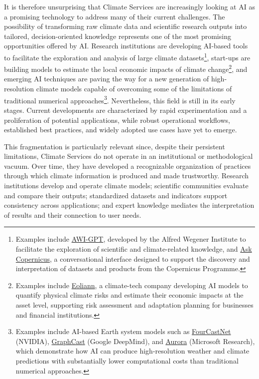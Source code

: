 It is therefore unsurprising that Climate Services are increasingly looking at AI as a promising technology to address many of their current challenges. The possibility of transforming raw climate data and scientific research outputs into tailored, decision-oriented knowledge represents one of the most promising opportunities offered by AI. Research institutions are developing AI-based tools to facilitate the exploration and analysis of large climate datasets\footnote{Examples include \href{https://helmholtz.software/software/awi-gpt}{AWI-GPT}, developed by the Alfred Wegener Institute to facilitate the exploration of scientific and climate-related knowledge, and \href{https://ask.copernicus.eu/}{Ask Copernicus}, a conversational interface designed to support the discovery and interpretation of datasets and products from the Copernicus Programme.}, start-ups are building models to estimate the local economic impacts of climate change\footnote{Examples include \href{https://www.eoliann.com/}{Eoliann}, a climate-tech company developing AI models to quantify physical climate risks and estimate their economic impacts at the asset level, supporting risk assessment and adaptation planning for businesses and financial institutions.}, and emerging AI techniques are paving the way for a new generation of high-resolution climate models capable of overcoming some of the limitations of traditional numerical approaches\footnote{Examples include AI-based Earth system models such as \href{https://github.com/NVlabs/FourCastNet}{FourCastNet} (NVIDIA), \href{https://www.nature.com/articles/s41586-023-06185-3}{GraphCast} (Google DeepMind), and \href{https://www.nature.com/articles/s41586-024-07744-y}{Aurora} (Microsoft Research), which demonstrate how AI can produce high-resolution weather and climate predictions with substantially lower computational costs than traditional numerical approaches.}. Nevertheless, this field is still in its early stages. Current developments are characterized by rapid experimentation and a proliferation of potential applications, while robust operational workflows, established best practices, and widely adopted use cases have yet to emerge.

This fragmentation is particularly relevant since, despite their persistent limitations, Climate Services do not operate in an institutional or methodological vacuum. Over time, they have developed a recognizable organization of practices through which climate information is produced and made trustworthy. Research institutions develop and operate climate models; scientific communities evaluate and compare their outputs; standardized datasets and indicators support consistency across applications; and expert knowledge mediates the interpretation of results and their connection to user needs.

